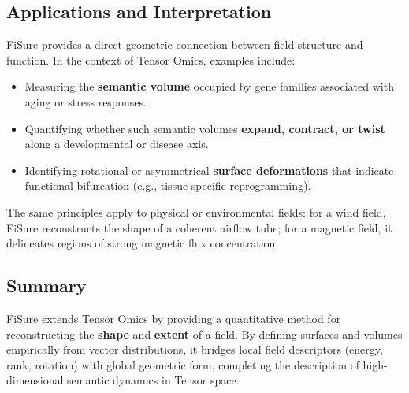     \subsection{Applications and Interpretation}

        FiSure provides a direct geometric connection between 
        field structure and function.  
        In the context of Tensor Omics, examples include:

        \begin{itemize}
            \item Measuring the \textbf{semantic volume} occupied by gene families 
                  associated with aging or stress responses.
            \item Quantifying whether such semantic volumes 
                  \textbf{expand, contract, or twist} along a 
                  developmental or disease axis.
            \item Identifying rotational or asymmetrical \textbf{surface deformations} 
                  that indicate functional bifurcation (e.g., 
                  tissue-specific reprogramming).
        \end{itemize}

        The same principles apply to physical or environmental fields:
        for a wind field, FiSure reconstructs the shape of a coherent 
        airflow tube; for a magnetic field, it delineates regions of 
        strong magnetic flux concentration.

    \subsection{Summary}

        FiSure extends Tensor Omics by providing a quantitative 
        method for reconstructing the \textbf{shape} and 
        \textbf{extent} of a field.  
        By defining surfaces and volumes empirically from vector distributions, 
        it bridges local field descriptors (energy, rank, rotation) with 
        global geometric form, completing the description of 
        high-dimensional semantic dynamics in Tensor space.
